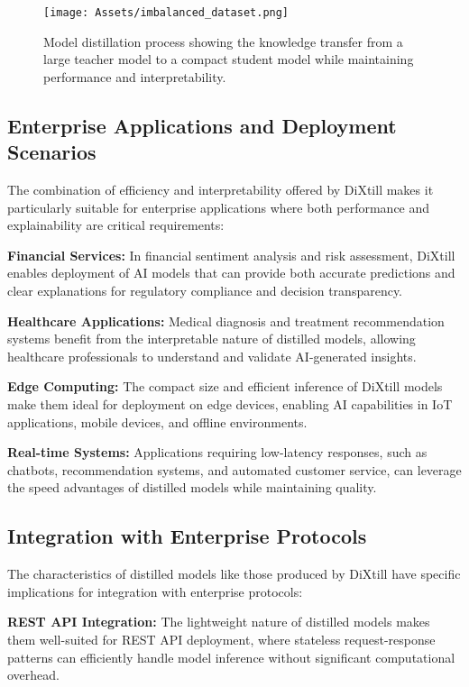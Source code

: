 \begin{figure}[H]
    \centering
    \texttt{[image: Assets/imbalanced\_dataset.png]}
    \caption{Model distillation process showing the knowledge transfer from a large teacher model to a compact student model while maintaining performance and interpretability.}
    \label{fig:model_distillation}
\end{figure}

\subsection{Enterprise Applications and Deployment Scenarios}

The combination of efficiency and interpretability offered by DiXtill makes it particularly suitable for enterprise applications where both performance and explainability are critical requirements:

\textbf{Financial Services:} In financial sentiment analysis and risk assessment, DiXtill enables deployment of AI models that can provide both accurate predictions and clear explanations for regulatory compliance and decision transparency.

\textbf{Healthcare Applications:} Medical diagnosis and treatment recommendation systems benefit from the interpretable nature of distilled models, allowing healthcare professionals to understand and validate AI-generated insights.

\textbf{Edge Computing:} The compact size and efficient inference of DiXtill models make them ideal for deployment on edge devices, enabling AI capabilities in IoT applications, mobile devices, and offline environments.

\textbf{Real-time Systems:} Applications requiring low-latency responses, such as chatbots, recommendation systems, and automated customer service, can leverage the speed advantages of distilled models while maintaining quality.

\subsection{Integration with Enterprise Protocols}

The characteristics of distilled models like those produced by DiXtill have specific implications for integration with enterprise protocols:

\textbf{REST API Integration:} The lightweight nature of distilled models makes them well-suited for REST API deployment, where stateless request-response patterns can efficiently handle model inference without significant computational overhead.

